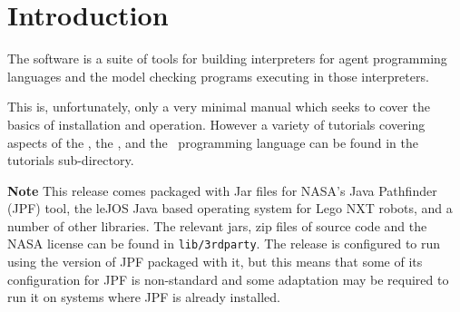 \chapter{Introduction}

The \mcapl{} software is a suite of tools for building interpreters
for agent programming languages and the model checking programs
executing in those interpreters.  

This is, unfortunately, only a very minimal manual which seeks to cover the basics of installation and operation.  However a variety of tutorials covering aspects of the \ajpf, the \ail, and the \gwendolen\ programming language can be found in the tutorials sub-directory.

{\bf Note} This release comes packaged with Jar files for NASA's Java Pathfinder (JPF) tool, the leJOS Java based operating system for Lego NXT robots, and a number of other libraries.  The relevant jars, zip files of source code and the NASA license can be found in \texttt{lib/3rdparty}.  The release is configured to run using the version of JPF packaged with it, but this means that some of its configuration for JPF is non-standard and some adaptation may be required to run it on systems where JPF is already installed.

